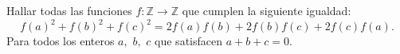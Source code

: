 Hallar todas las funciones $f : \mathbb{Z} \to \mathbb{Z}$ que cumplen la siguiente igualdad:
\[f(a)^2+f(b)^2+f(c)^2=2f(a)f(b)+2f(b)f(c)+2f(c)f(a).\]
Para todos los enteros $a,$ $b,$ $c$ que satisfacen $a+b+c=0$.
